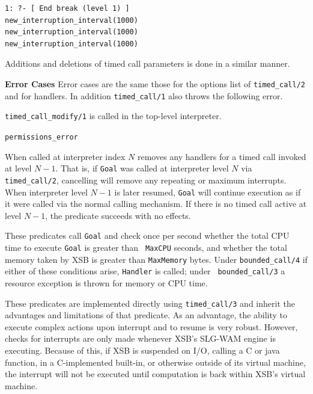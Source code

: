 \begin{description}
\begin{verbatim}
1: ?- [ End break (level 1) ]
new_interruption_interval(1000)
new_interruption_interval(1000)
new_interruption_interval(1000)
\end{verbatim}

Additions and deletions of timed call parameters is done in a similar
manner.

{\bf Error Cases} 
%
Error cases are the same those for the options list of 
{\tt timed\_call/2} and for handlers.  In addition {\tt timed\_call/1}
also throws the following error.

\bi
\item {\tt timed\_call\_modify/1} is called in the top-level interpreter.
\bi
\item {\tt permissions\_error}
\ei
\ei
%

%
When called at interpreter index $N$ removes any handlers for a timed
call invoked at level $N-1$.  That is, if {\tt Goal} was called at
interpreter level $N$ via {\tt timed\_call/2}, cancelling will remove
any repeating or maximum interrupts.  When interpreter level $N-1$ is
later resumed, {\tt Goal} will continue execution as if it were called
via the normal calling mechanism.  If there is no timed call active at
level $N-1$, the predicate succeeds with no effects.


%
These predicates call {\tt Goal} and check once per second
whether the total CPU time to execute {\tt Goal} is greater than {\tt
  MaxCPU} seconds, and whether the total memory taken by XSB is
greater than {\tt MaxMemory} bytes.  Under {\tt bounded\_call/4} if
either of these conditions arise, {\tt Handler} is called; under {\tt
  bounded\_call/3} a resource exception is thrown for memory or CPU
time.  

These predicates are implemented directly using {\tt timed\_call/3}
and inherit the advantages and limitations of that predicate.  As an
advantage, the ability to execute complex actions upon interrupt and
to resume is very robust.  However, checks for interrupts are only
made whenever XSB's SLG-WAM engine is executing.  Because of this, if
XSB is suspended on I/O, calling a C or java function, in a
C-implemented built-in, or otherwise outside of its virtual machine,
the interrupt will not be executed until computation is back within
XSB's virtual machine.


\end{description}
